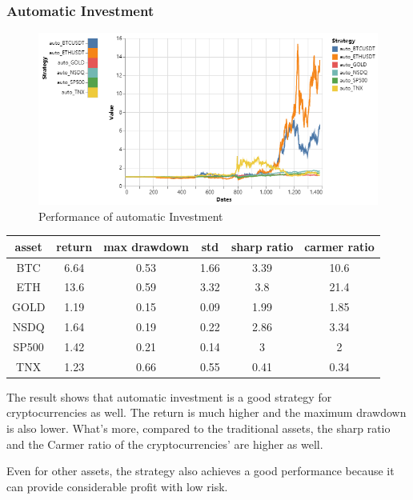 \documentclass[a4paper]{article}
\begin{document}
\subsubsection{Automatic Investment}
\begin{figure}[H]
    \centering
    \includegraphics[scale=0.5]{Q2.png}
    \caption{Performance of automatic Investment}
\end{figure}
\begin{table}[H]
    \centering
    \begin{tabular}{@{}|c|c|c|c|c|c|@{}}
    \hline
    asset   & return & max drawdown & std & sharp ratio & carmer ratio \\ \hline
    BTC     & 6.64   & 0.53 & 1.66 & 3.39  & 10.6 \\ \hline
    ETH     & 13.6   & 0.59 & 3.32 & 3.8   & 21.4\\ \hline
    GOLD    & 1.19   & 0.15 & 0.09 & 1.99  & 1.85\\ \hline
    NSDQ    & 1.64   & 0.19 & 0.22 & 2.86  & 3.34\\ \hline
    SP500   & 1.42   & 0.21 & 0.14 & 3     & 2\\ \hline
    TNX     & 1.23   & 0.66 & 0.55 & 0.41  & 0.34\\ \hline
    \end{tabular}
\end{table}
The result shows that automatic investment is a good strategy for cryptocurrencies as well. The return is much higher and the maximum drawdown is also lower. What's more, compared to the traditional assets, the sharp ratio and the Carmer ratio of the cryptocurrencies’ are higher as well.
\par Even for other assets, the strategy also achieves a good performance because it can provide considerable profit with low risk. 
\end{document}
